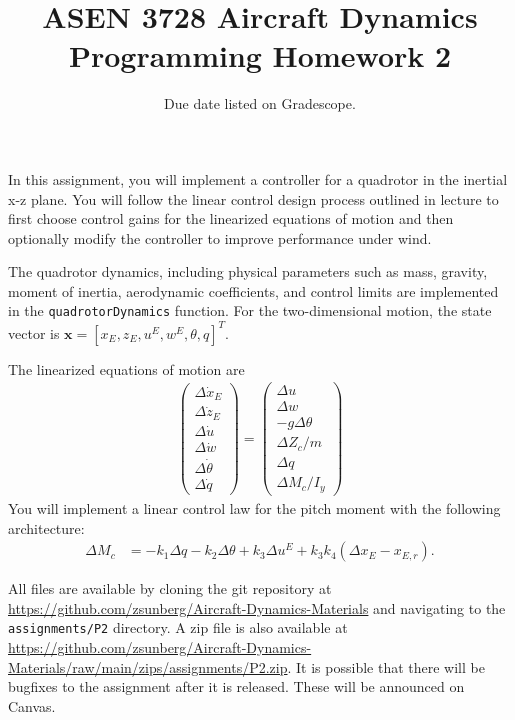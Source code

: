\documentclass{article}
\title{ASEN 3728 Aircraft Dynamics\\Programming Homework 2}
\date{Due date listed on Gradescope.}
\theoremstyle{definition}
\begin{document}
\maketitle

In this assignment, you will implement a controller for a quadrotor in the inertial x-z plane. You will follow the linear control design process outlined in lecture to first choose control gains for the linearized equations of motion and then optionally modify the controller to improve performance under wind.

The quadrotor dynamics, including physical parameters such as mass, gravity, moment of inertia, aerodynamic coefficients, and control limits are implemented in the \texttt{quadrotorDynamics} function.
For the two-dimensional motion, the state vector is $\mathbf{x} = [x_E,z_E,u^E,w^E,\theta,q]^T$. 

The linearized equations of motion are
    \begin{align*}
        \begin{pmatrix}
            \Delta \dot{x}_E \\
            \Delta \dot{z}_E \\
            \Delta \dot{u} \\
            \Delta \dot{w} \\
            \Delta \dot{\theta} \\
            \Delta \dot{q}
        \end{pmatrix}
        =
        \begin{pmatrix}
            \Delta u \\
            \Delta w \\
            -g \Delta \theta \\
            \Delta Z_c / m \\
            \Delta q \\
            \Delta M_c / I_y
        \end{pmatrix}
    \end{align*}
You will implement a linear control law for the pitch moment with the following architecture:
    \begin{align*}
        \Delta M_c &= -k_1 \Delta q -k_2 \Delta \theta +k_3 \Delta u^E + k_3 k_4 (\Delta x_E - x_{E,r}) \text{.}
    \end{align*}

All files are available by cloning the git repository at \url{https://github.com/zsunberg/Aircraft-Dynamics-Materials} and navigating to the \texttt{assignments/P2} directory. A zip file is also available at \url{https://github.com/zsunberg/Aircraft-Dynamics-Materials/raw/main/zips/assignments/P2.zip}. It is possible that there will be bugfixes to the assignment after it is released. These will be announced on Canvas. %
\end{document}
